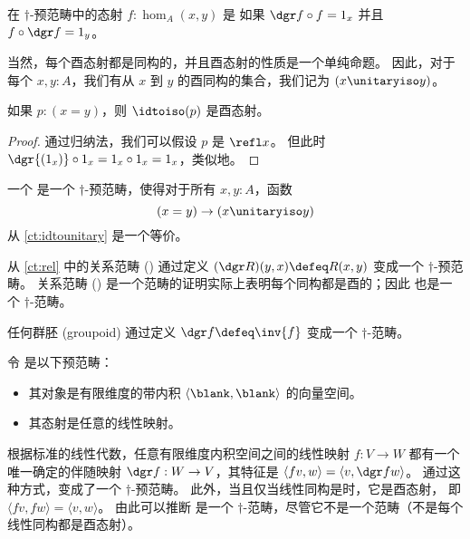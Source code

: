 \begin{defn}\label{ct:unitary}
在 $\dagger$-预范畴中的态射 $f:\hom_A(x,y)$ 是
%
%
%
%
如果 $\dgr f \circ f = 1_x$ 并且 $f\circ \dgr f = 1_y$。
\end{defn}

当然，每个酉态射都是同构的，并且酉态射的性质是一个单纯命题。
因此，对于每个 $x,y:A$，我们有从 $x$ 到 $y$ 的酉同构的集合，我们记为 $(x\unitaryiso y)$。

\begin{lem}\label{ct:idtounitary}
如果 $p:(x=y)$，则 $\idtoiso(p)$ 是酉态射。
\end{lem}
\begin{proof}
  通过归纳法，我们可以假设 $p$ 是 $\refl x$。
  但此时 $\dgr{(1_x)} \circ 1_x = 1_x\circ 1_x = 1_x$，类似地。
\end{proof}

\begin{defn}\label{ct:dagger-category}
一个
%
是一个 $\dagger$-预范畴，使得对于所有 $x,y:A$，函数
\[ (x=y) \to (x \unitaryiso y) \]
从 \cref{ct:idtounitary} 是一个等价。
\end{defn}

\begin{eg}\label{ct:rel-dagger-cat}
从 \cref{ct:rel} 中的关系范畴 (\urel) 通过定义 $(\dgr R)(y,x) \defeq R(x,y)$ 变成一个 $\dagger$-预范畴。
关系范畴 (\urel) 是一个范畴的证明实际上表明每个同构都是酉的；因此 \urel 也是一个 $\dagger$-范畴。
\end{eg}

\begin{eg}\label{ct:groupoid-dagger-cat}
任何群胚 (groupoid) 通过定义 $\dgr f \defeq \inv{f}$ 变成一个 $\dagger$-范畴。
\end{eg}

\begin{eg}\label{ct:hilb}
令 \uhilb 是以下预范畴：
\begin{itemize}
  \item 其对象是有限维度的带内积 $\langle \blank,\blank\rangle$ 的向量空间。
  \item 其态射是任意的线性映射。
\end{itemize}
根据标准的线性代数，任意有限维度内积空间之间的线性映射 $f:V\to W$ 都有一个唯一确定的伴随映射 $\dgr f:W\to V$，其特征是 $\langle f v,w\rangle = \langle v,\dgr f w\rangle$。
通过这种方式，\uhilb 变成了一个 $\dagger$-预范畴。
此外，当且仅当线性同构是时，它是酉态射，
%
即 $\langle fv,fw\rangle = \langle v,w\rangle$。
由此可以推断 \uhilb 是一个 $\dagger$-范畴，尽管它不是一个范畴（不是每个线性同构都是酉态射）。
\end{eg}

